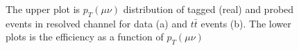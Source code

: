 \begin{figure}[ht]
	\begin{center}
		\caption{The upper plot is $p_{T}(\mu\nu)$ distribution of tagged (real) and probed events in resolved channel for data (a) and $t\bar{t}$ events (b). The lower plots is the efficiency as a function of $p_{T}(\mu\nu)$}
		\label{Fig:eff_met_resolved}
	\end{center}
\end{figure}
\noindent
